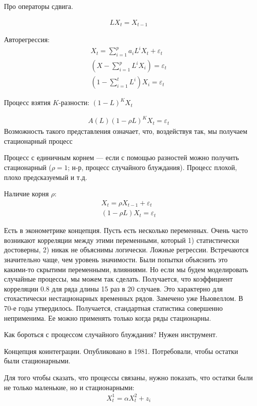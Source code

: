 \documentclass{book}
\begin{document}
Про операторы сдвига.

\begin{gather*}
  LX_t=X_{t-1}
\end{gather*}

Авторегрессия:
\begin{gather*}
  X_t = \sum_{i=1}^{p} {a_iL^iX_t} + \varepsilon_t\\
  \left(X-\sum_{i=1}^{p} {L^iX_i}\right)=\varepsilon_t\\
  \left(1-\sum_{i=1}^{t} {L^i}\right)X_i=\varepsilon_t
\end{gather*}

Процесс взятия $K$-разности: $(1-L)^K X_t$

\begin{gather*}
  A(L)(1-\rho L)^KX_t=\varepsilon_t
\end{gather*}
Возможность такого представления означает, что, воздействуя так, мы получаем стационарный процесс

Процесс с единичным корнем --- если с помощью разностей можно получить стационарный ($\rho=1$; н-р, процесс случайного блуждания). Процесс плохой, плохо предсказуемый и т.д.

Наличие корня $\rho$:
\begin{gather*}
  X_t=\rho X_{t-1}+\varepsilon_t\\
  (1-\rho L)X_t=\varepsilon_t
\end{gather*}

Есть в эконометрике концепция.
Пусть есть несколько переменных.
Очень часто возникают корреляции между этими переменными, который 1) статистически достоверны, 2) никак не объяснимы логически.
Ложные регрессии.
Встречаются значительно чаще, чем уровень значимости.
Были попытки объяснить это какими-то скрытими переменными, влияниями.
Но если мы будем моделировать случайные процессы, мы можем так сделать.
Получается, что коэффициент корреляции 0.8 для ряда длины 15 раз в 20 случаев.
Это характерно для стохастически нестационарных временных рядов.
Замечено уже Ньювеллом.
В 70-е годы утвердилось.
Получается, стандартная статистика совершенно неприменима. Ее можно применять только когда ряды стационарны.

Как бороться с процессом случайного блуждания? Нужен инструмент.

Концепция коинтеграции. Опубликовано в 1981. Потребовали, чтобы остатки были стационарными.

Для того чтобы сказать, что процессы связаны, нужно показать, что остатки были не только маленькие, но и стационарными:
\begin{gather*}
  X^1_t=\alpha X^2_t+z_i
\end{gather*}
\end{document}
